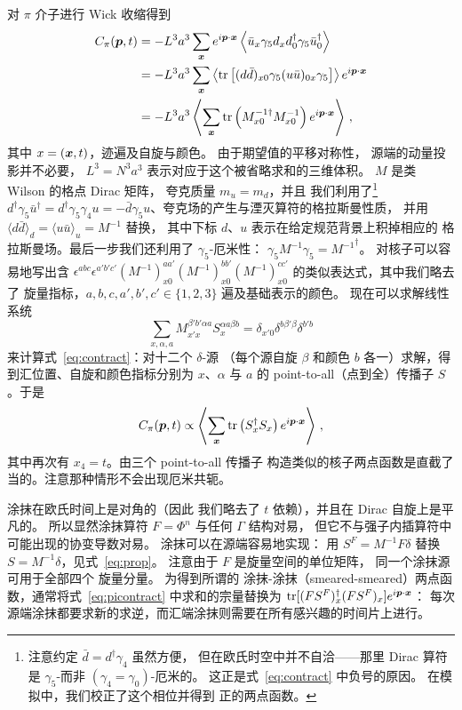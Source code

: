 对 $\pi$ 介子进行 Wick 收缩得到
\begin{align}
C_{\pi}(\boldsymbol{p},t)
&= -L^3a^3\sum_{\boldsymbol{x}}
e^{i \boldsymbol{p}\cdot\boldsymbol{x}} \left\langle\bar{u}_x \gamma_5 d_{x} d^{\dagger}_0 \gamma_5
\bar{u}^{\dagger}_0\right\rangle\label{eq:contract} \\\nonumber
&=-L^3a^3\sum_{\boldsymbol{x}}\left\langle\mathop{\textmd{tr}}\nolimits\left[(d\bar{d})_{x0}\gamma_5
(u\bar{u})_{0x}\gamma_5\right]\right\rangle e^{i \boldsymbol{p}\cdot\boldsymbol{x}}\\
&=-L^3a^3\left\langle\sum_{\boldsymbol{x}}\mathop{\textmd{tr}}\nolimits\left(M^{-1\dagger}_{x0}M^{-1}_{x0}
\right)e^{i \boldsymbol{p}\cdot\boldsymbol{x}}\right\rangle\,,\nonumber
\end{align}
其中 $x=(\boldsymbol{x},t)$，迹遍及自旋与颜色。
由于期望值的平移对称性，
源端的动量投影并不必要，
$L^3=N^3a^3$ 表示对应于这个被省略求和的三维体积。
$M$ 是类 Wilson 的格点 Dirac 矩阵，
夸克质量 $m_u=m_d$，并且
我们利用了\footnote{注意约定
$\bar{d}=d^{\dagger}\gamma_4$ 虽然方便，
但在欧氏时空中并不自洽——那里
Dirac 算符是 $\gamma_5$-而非
$(\gamma_4=\gamma_0)$-厄米的。
这正是式~\eqref{eq:contract} 中负号的原因。
在模拟中，我们校正了这个相位并得到
正的两点函数。} $d^\dagger\gamma_5\bar{u}^\dagger=d^\dagger
\gamma_5\gamma_4u=-\bar{d}\gamma_5u$、夸克场的产生与湮灭算符的格拉斯曼性质，
并用
$\langle d\bar{d}\rangle_d=\langle u\bar{u}\rangle_u=M^{-1}$ 替换，
其中下标 $d$、$u$ 表示在给定规范背景上积掉相应的
格拉斯曼场。最后一步我们还利用了 $\gamma_5$-厄米性：
$\gamma_5M^{-1}\gamma_5={M^{-1}}^{\dagger}$。
对核子可以容易地写出含
$\epsilon^{abc}\epsilon^{a'b'c'}(M^{-1})_{x0}^{aa'}
(M^{-1})_{x0}^{bb'}(M^{-1})_{x0}^{cc'}$
的类似表达式，其中我们略去了
旋量指标，$a,b,c,a',b',c'\in\{1,2,3\}$ 遍及基础表示的颜色。
现在可以求解线性系统
\begin{equation}
\sum_{x,\alpha, a}M^{\beta' b'\alpha a}_{x'x}S^{\alpha a \beta  b}_x=\delta_{x'0}\delta^{b\beta'\beta}\delta^{b'b}\label{eq:prop}
\end{equation}
来计算式~\eqref{eq:contract}：对十二个 $\delta$-源
（每个源自旋 $\beta$ 和颜色 $b$ 各一）求解，得到汇位置、自旋和颜色指标分别为
$x$、$\alpha$ 与 $a$ 的 point-to-all（点到全）传播子 $S$。于是
\begin{equation}
C_{\pi}(\boldsymbol{p},t)\propto\left\langle\sum_{\boldsymbol{x}}\mathop{\textmd{tr}}\nolimits\left(S^{\dagger}_xS_x\right)e^{i\boldsymbol{p}\cdot\boldsymbol{x}}
\right\rangle\,,\label{eq:picontract}
\end{equation}
其中再次有 $x_4=t$。由三个 point-to-all 传播子
构造类似的核子两点函数是直截了当的。注意那种情形不会出现厄米共轭。

涂抹在欧氏时间上是对角的（因此
我们略去了 $t$ 依赖），并且在 Dirac 自旋上是平凡的。
所以显然涂抹算符 $F=\Phi^n$ 与任何 $\Gamma$ 结构对易，
但它不与强子内插算符中可能出现的协变导数对易。
涂抹可以在源端容易地实现：
用 $S^F=M^{-1}F\delta$ 替换 $S=M^{-1}\delta$，见式~\eqref{eq:prop}。
注意由于 $F$ 是旋量空间的单位矩阵，
同一个涂抹源可用于全部四个
旋量分量。
为得到所谓的
涂抹-涂抹（smeared-smeared）两点函数，通常将式~\eqref{eq:picontract} 中求和的宗量替换为
$\mathop{\textmd{tr}}\nolimits[(FS^{F})^{\dagger}_{x}(FS^{F})_{x}]e^{i\boldsymbol{p}\cdot\boldsymbol{x}}$：
每次源端涂抹都要求新的求逆，而汇端涂抹则需要在所有感兴趣的时间片上进行。\\

